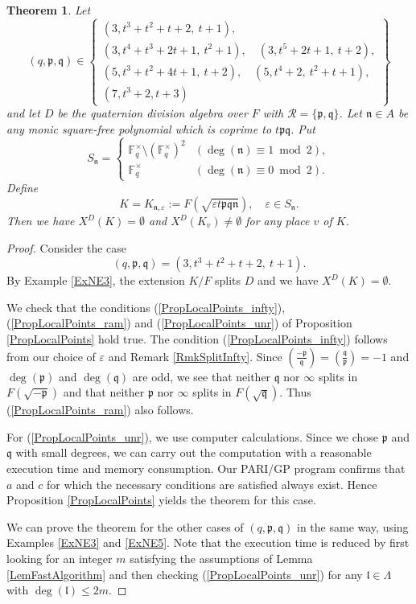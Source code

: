 \documentclass[10pt]{amsart}
\theoremstyle{plain}
\newtheorem{thm}{Theorem}[section]
\theoremstyle{definition}
\newcommand{\cR}{\mathcal{R}}
\newcommand{\vep}{\varepsilon}
\newcommand{\bF}{\mathbb{F}}
\newcommand{\frl}{\mathfrak{l}}
\newcommand{\frn}{\mathfrak{n}}
\newcommand{\frp}{\mathfrak{p}}
\newcommand{\frq}{\mathfrak{q}}
\begin{document}
\begin{thm}\label{ThmExVHP}
	Let
	\[
	(q,\frp,\frq)\in\left\{\begin{gathered}
		(3,t^3 + t^2 + t + 2,\ t+1),\\
		(3,t^4 + t^3 + 2t + 1,\ t^2 + 1),\quad (3,t^5 + 2t + 1,\ t+2),\\
		(5,t^3 + t^2 + 4 t + 1,\ t+2),\quad (5,t^4 + 2,\ t^2 + t + 1),\\(7,t^3+2,t+3)
	\end{gathered}\right\}
	\]
	and let $D$ be the quaternion division algebra over $F$ with $\cR=\{\frp,\frq\}$.
	Let $\frn\in A$ be any monic square-free polynomial which is coprime to $t\frp\frq$. Put
	\[
	S_\frn=\left\{\begin{array}{ll}
		\bF_q^\times\setminus (\bF_q^\times)^2& (\deg(\frn)\equiv 1\bmod 2),\\
		\bF_q^\times &  (\deg(\frn)\equiv 0\bmod 2).
	\end{array}\right.
	\]
	Define
	\[
	K=K_{\frn,\vep}:=F(\sqrt{\vep t\frp\frq\frn}),\quad \vep\in S_\frn.
	\]
	Then we have $X^D(K)=\emptyset$ and $X^D(K_v)\neq\emptyset$ for any place $v$ of $K$. 
\end{thm}
\begin{proof}
	Consider the case
	\[
	(q,\frp,\frq)=(3,t^3 + t^2 + t + 2,\ t+1).
	\]
	By Example \ref{ExNE3}, the extension $K/F$ splits $D$ and 
	we have $X^D(K)=\emptyset$.
	
	We check that the conditions (\ref{PropLocalPoints_infty}), (\ref{PropLocalPoints_ram}) and (\ref{PropLocalPoints_unr})
	of Proposition \ref{PropLocalPoints} hold true. The condition (\ref{PropLocalPoints_infty}) follows from our choice of $\vep$ and 
	Remark \ref{RmkSplitInfty}. Since $(\frac{-\frp}{\frq})=(\frac{\frq}{\frp})=-1$ and 
	$\deg(\frp)$ and $\deg(\frq)$ are odd,
	we see that neither $\frq$ nor $\infty$ splits in $F(\sqrt{-\frp})$ and that neither $\frp$ nor $\infty$ splits in $F(\sqrt{\frq})$.
	Thus (\ref{PropLocalPoints_ram}) also follows.
	
	For (\ref{PropLocalPoints_unr}), we use computer calculations. 
	Since we chose $\frp$ and $\frq$ with small degrees,
	we can carry out the computation with a reasonable execution time and memory consumption.
	Our PARI/GP program confirms that $a$ and $c$ for which the necessary conditions are satisfied always exist. 
	Hence Proposition \ref{PropLocalPoints} yields the theorem for this case.

	We can prove the theorem for the other cases of $(q,\frp,\frq)$ in the same way, using Examples \ref{ExNE3} and \ref{ExNE5}.
	Note that the execution time is reduced by first 
	looking for an integer $m$ satisfying the assumptions of Lemma \ref{LemFastAlgorithm}
	and then checking (\ref{PropLocalPoints_unr}) for any $\frl\in \Lambda$ with $\deg(\frl)\leq 2m$.
\end{proof}
\end{document}
